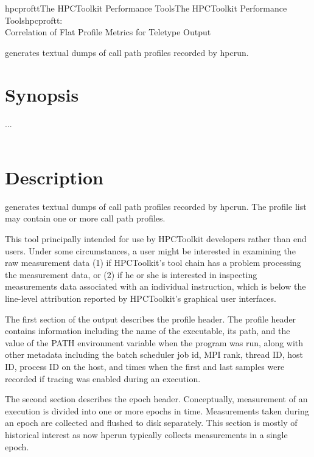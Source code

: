 \documentclass[english]{article}
\begin{document}
\begin{Name}{1}{hpcproftt}{The HPCToolkit Performance Tools}{The HPCToolkit Performance Tools}{hpcproftt:\\ Correlation of Flat Profile Metrics for Teletype Output}


 generates textual dumps of call path profiles recorded by hpcrun.

\end{Name}

\section{Synopsis}

  ...\\
 \\
 


\section{Description}

 generates textual dumps of call path profiles recorded
by hpcrun.  The profile list may contain one or more call path profiles.

This tool principally intended for use by HPCToolkit developers rather
than end users. Under some circumstances, a user might be interested in
examining the raw measurement data (1) if HPCToolkit's tool chain has a problem processing
the measurement data, or (2) if he or she is interested in inspecting
measurements data associated with an individual instruction, which is below the
line-level attribution reported by HPCToolkit's graphical user interfaces.

The first section of the output describes the profile header. The profile
header contains information including the name of the executable, its
path, and the value of the PATH environment variable when the program was
run, along with other metadata including the batch scheduler job id, MPI
rank, thread ID, host ID, process ID on the host, and times when the first
and last samples were recorded if tracing was enabled during an execution.

The second section describes the epoch header. Conceptually, measurement
of an execution is divided into one or more epochs in time. Measurements
taken during an epoch are collected and flushed to disk separately. This
section is mostly of historical interest as now hpcrun typically collects
measurements in a single epoch.
\end{document}
